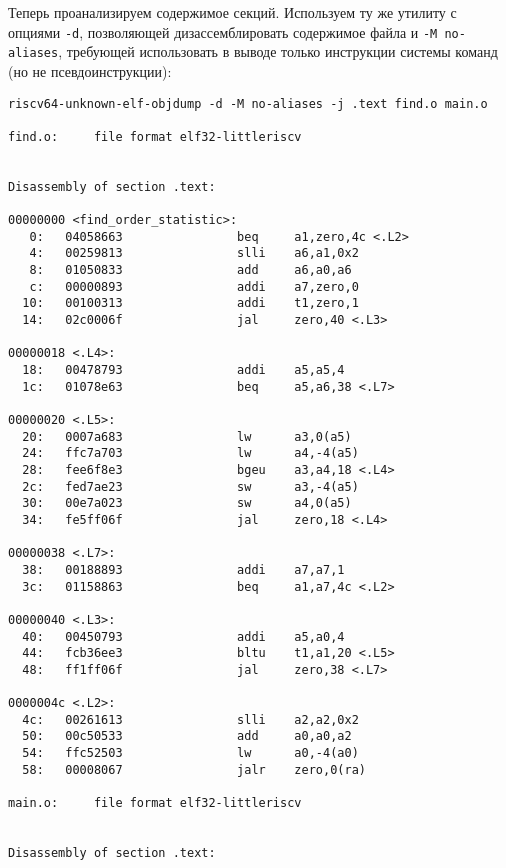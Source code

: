     Теперь проанализируем содержимое секций. Используем ту же утилиту с опциями \verb|-d|, позволяющей дизассемблировать содержимое файла и \verb|-M no-aliases|, требующей использовать в выводе только инструкции системы команд (но не псевдоинструкции):
    \begin{Verbatim}[breaklines=true]
riscv64-unknown-elf-objdump -d -M no-aliases -j .text find.o main.o

find.o:     file format elf32-littleriscv


Disassembly of section .text:

00000000 <find_order_statistic>:
   0:   04058663                beq     a1,zero,4c <.L2>
   4:   00259813                slli    a6,a1,0x2
   8:   01050833                add     a6,a0,a6
   c:   00000893                addi    a7,zero,0
  10:   00100313                addi    t1,zero,1
  14:   02c0006f                jal     zero,40 <.L3>

00000018 <.L4>:
  18:   00478793                addi    a5,a5,4
  1c:   01078e63                beq     a5,a6,38 <.L7>

00000020 <.L5>:
  20:   0007a683                lw      a3,0(a5)
  24:   ffc7a703                lw      a4,-4(a5)
  28:   fee6f8e3                bgeu    a3,a4,18 <.L4>
  2c:   fed7ae23                sw      a3,-4(a5)
  30:   00e7a023                sw      a4,0(a5)
  34:   fe5ff06f                jal     zero,18 <.L4>

00000038 <.L7>:
  38:   00188893                addi    a7,a7,1
  3c:   01158863                beq     a1,a7,4c <.L2>

00000040 <.L3>:
  40:   00450793                addi    a5,a0,4
  44:   fcb36ee3                bltu    t1,a1,20 <.L5>
  48:   ff1ff06f                jal     zero,38 <.L7>

0000004c <.L2>:
  4c:   00261613                slli    a2,a2,0x2
  50:   00c50533                add     a0,a0,a2
  54:   ffc52503                lw      a0,-4(a0)
  58:   00008067                jalr    zero,0(ra)

main.o:     file format elf32-littleriscv


Disassembly of section .text:


\end{Verbatim}
